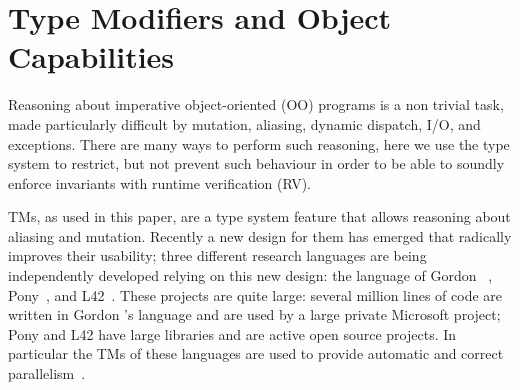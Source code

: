 \section{Type Modifiers and Object Capabilities}
\label{s:TMsAndOCs}
Reasoning about imperative object-oriented (OO) programs is a non trivial task,
made particularly difficult by mutation, aliasing, dynamic dispatch, I/O, and exceptions. There are many ways to perform such reasoning, here we use the type system to restrict, but not prevent such behaviour in order to be able to soundly enforce invariants with runtime verification (RV).

TMs, as used in this paper, are a type system feature that allows reasoning about aliasing and mutation. Recently a new design for them has emerged that radically improves their usability;
three different research languages are being independently developed relying on this new design: the language of Gordon \etal~\cite{GordonEtAl12}, Pony~\cite{clebsch2015deny,clebsch2017orca}, and L42~\cite{ServettoZucca15,ServettoEtAl13a,JOT:issue_2011_01/article1,GianniniEtAl16}.
These projects are quite large: several million lines of code are written in Gordon \etal's language and are used by a large private Microsoft project; Pony and L42 have large libraries and are active open source projects. In particular the TMs of these languages are used to provide automatic and correct parallelism~\cite{GordonEtAl12,clebsch2015deny,clebsch2017orca,ServettoEtAl13a}.

